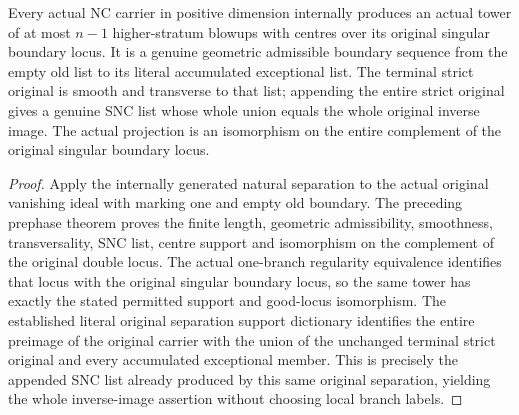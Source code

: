 \begin{theorem}
\label{hir:general-nc-original-smooth-locus-snc-prephase}
\leanok
{}
Every actual NC carrier in positive dimension internally produces
an actual tower of at most $n-1$ higher-stratum blowups with centres
over its original singular boundary locus. It is a genuine geometric
admissible boundary sequence from the empty old list to its literal
accumulated exceptional list. The terminal strict original is smooth
and transverse to that list; appending the entire strict original
gives a genuine SNC list whose whole union equals the whole original
inverse image. The actual projection is an isomorphism on the entire
complement of the original singular boundary locus.
\end{theorem}
\begin{proof}
Apply the internally generated natural separation to the actual
original vanishing ideal with marking one and empty old boundary.
The preceding prephase theorem proves the finite length, geometric
admissibility, smoothness, transversality, SNC list, centre support
and isomorphism on the complement of the original double locus.
The actual one-branch regularity equivalence identifies that locus
with the original singular boundary locus, so the same tower has
exactly the stated permitted support and good-locus isomorphism.
The established literal original separation support dictionary
identifies the entire preimage of the original carrier with the
union of the unchanged terminal strict original and every accumulated
exceptional member. This is precisely the appended SNC list already
produced by this same original separation, yielding the whole
inverse-image assertion without choosing local branch labels.
\end{proof}
